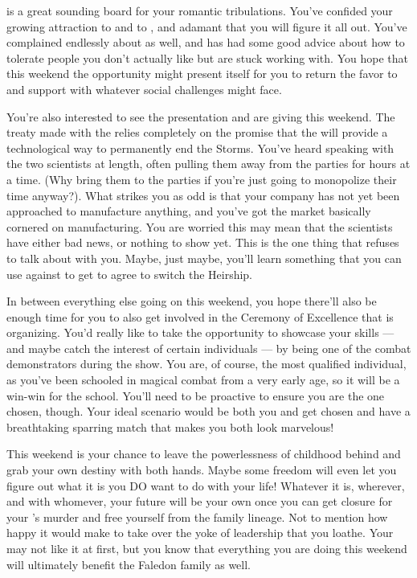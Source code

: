\documentclass[char]{GL2020}
\begin{document}
\cAssistantScientist{} is a great sounding board for your romantic tribulations. You’ve confided your growing attraction to \cChupStudent{} and \cPresident{} to \cAssistantScientist{\them}, and \cAssistantScientist{\theyare} adamant that you will figure it all out. You’ve complained endlessly about \cWarlordDaughter{} as well, and \cAssistantScientist{} has had some good advice about how to tolerate people you don’t actually like but are stuck working with. You hope that this weekend the opportunity might present itself for you to return the favor to \cAssistantScientist{} and support \cAssistantScientist{\them} with whatever social challenges \cAssistantScientist{\they} might face.

You're also interested to see the presentation \cHeadScientist{\full} and \cAssistantScientist{} are giving this weekend. The treaty \cDiplomat{} made with the \pFarm{} relies completely on the promise that the \pTech{} will provide a technological way to permanently end the Storms. You've heard \cDiplomat{} speaking with the two scientists at length, often pulling them away from the parties for hours at a time. (Why bring them to the parties if you're just going to monopolize their time anyway?). What strikes you as odd is that your company has not yet been approached to manufacture anything, and you've got the market basically cornered on manufacturing. You are worried this may mean that the scientists have either bad news, or nothing to show yet. This is the one thing that \cAssistantScientist{} refuses to talk about with you. Maybe, just maybe, you’ll learn something that you can use against \cDiplomat{} to get \cDiplomat{\them} to agree to switch the Heirship.

In between everything else going on this weekend, you hope there'll also be enough time for you to also get involved in the Ceremony of Excellence that \cMusic{\full} is organizing. You'd really like to take the opportunity to showcase your skills — and maybe catch the interest of certain individuals — by being one of the combat demonstrators during the show. You are, of course, the most qualified individual, as you've been schooled in magical combat from a very early age, so it will be a win-win for the school. You'll need to be proactive to ensure you are the one chosen, though. Your ideal scenario would be both you and \cAmbition{} get chosen and have a breathtaking sparring match that makes you both look marvelous!

This weekend is your chance to leave the powerlessness of childhood behind and grab your own destiny with both hands. Maybe some freedom will even let you figure out what it is you DO want to do with your life! Whatever it is, wherever, and with whomever, your future will be your own once you can get closure for your \cHeirSibling{\sibling}'s murder and free yourself from the family lineage. Not to mention how happy it would make \cAmbition{} to take over the yoke of leadership that you loathe. Your \cFaledonParent{\parent} may not like it at first, but you know that everything you are doing this weekend will ultimately benefit the Faledon family as well.  
\end{document}
